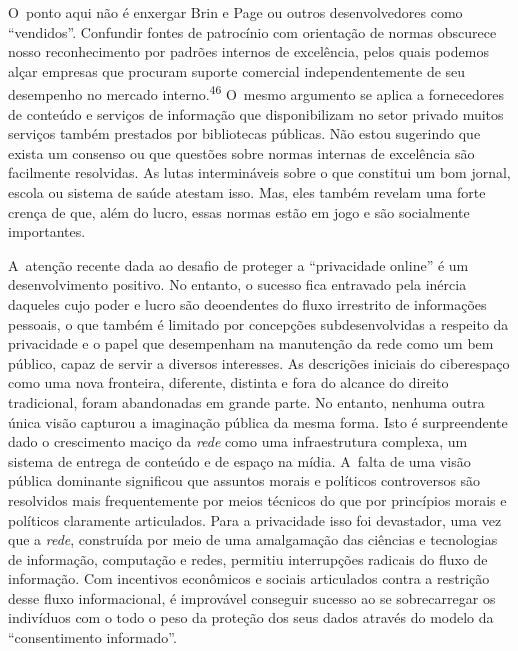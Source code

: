 O~ponto aqui não é enxergar Brin e Page ou outros desenvolvedores como
``vendidos''. Confundir fontes de patrocínio com orientação de normas
obscurece nosso reconhecimento por padrões internos de excelência, pelos
quais podemos alçar empresas que procuram suporte comercial
independentemente de seu desempenho no mercado
interno.\textsuperscript{{46}} O~mesmo argumento se aplica a
fornecedores de conteúdo e serviços de informação que disponibilizam no
setor privado muitos serviços também prestados por bibliotecas públicas.
Não estou sugerindo que exista um consenso ou que questões sobre normas
internas de excelência são facilmente resolvidas. As lutas intermináveis
sobre o que constitui um bom jornal, escola ou sistema de saúde atestam
isso. Mas, eles também revelam uma forte crença de que, além do lucro,
essas normas estão em jogo e são socialmente importantes.

A~atenção recente dada ao desafio de proteger a ``privacidade online'' é
um desenvolvimento positivo. No entanto, o sucesso fica entravado pela
inércia daqueles cujo poder e lucro são deoendentes do fluxo irrestrito
de informações pessoais, o que também é limitado por concepções
subdesenvolvidas a respeito da privacidade e o papel que desempenham na
manutenção da rede como um bem público, capaz de servir a diversos
interesses. As descrições iniciais do ciberespaço como uma nova
fronteira, diferente, distinta e fora do alcance do direito tradicional,
foram abandonadas em grande parte. No entanto, nenhuma outra única visão
capturou a imaginação pública da mesma forma. Isto é surpreendente dado
o crescimento maciço da \emph{rede} como uma infraestrutura complexa, um
sistema de entrega de conteúdo e de espaço na mídia. A~falta de uma
visão pública dominante significou que assuntos morais e políticos
controversos são resolvidos mais frequentemente por meios técnicos do
que por princípios morais e políticos claramente articulados. Para a
privacidade isso foi devastador, uma vez que a \emph{rede}, construída
por meio de uma amalgamação das ciências e tecnologias de informação,
computação e redes, permitiu interrupções radicais do fluxo de
informação. Com incentivos econômicos e sociais articulados contra a
restrição desse fluxo informacional, é improvável conseguir sucesso ao
se sobrecarregar os indivíduos com o todo o peso da proteção dos seus
dados através do modelo da ``consentimento informado''.


